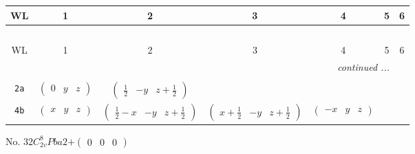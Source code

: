 \documentclass[fleqn,9pt,landscape]{jsarticle}
\begin{document}
\begin{center}
\renewcommand{\arraystretch}{1.2}
\begin{longtable}{ccccccc}
 \hline \hline
WL & 1 & 2 & 3 & 4 & 5 & 6 \\ \hline \endfirsthead

\multicolumn{6}{l}{\tablename\ \thetable{}} \\
 \hline \hline
WL & 1 & 2 & 3 & 4 & 5 & 6 \\ \hline \endhead

 \hline \hline
\multicolumn{6}{r}{\footnotesize\it continued ...} \\ \endfoot

 \hline \hline
\multicolumn{6}{r}{} \\ \endlastfoot

{\tt 2a} & $ \begin{pmatrix} 0 & y & z \end{pmatrix} $ & $ \begin{pmatrix} \frac{1}{2} & - y & z + \frac{1}{2} \end{pmatrix} $ & $  $ & $  $ \\ \hline
{\tt 4b} & $ \begin{pmatrix} x & y & z \end{pmatrix} $ & $ \begin{pmatrix} \frac{1}{2} - x & - y & z + \frac{1}{2} \end{pmatrix} $ & $ \begin{pmatrix} x + \frac{1}{2} & - y & z + \frac{1}{2} \end{pmatrix} $ & $ \begin{pmatrix} - x & y & z \end{pmatrix} $ \\
\end{longtable}
\end{center}
\newpage
No. 32\quad$C_{2v}^{8}$\quad$Pba2$\quad[ orthorhombic ]\quad$+\begin{pmatrix} 0 & 0 & 0 \end{pmatrix}$
\end{document}
